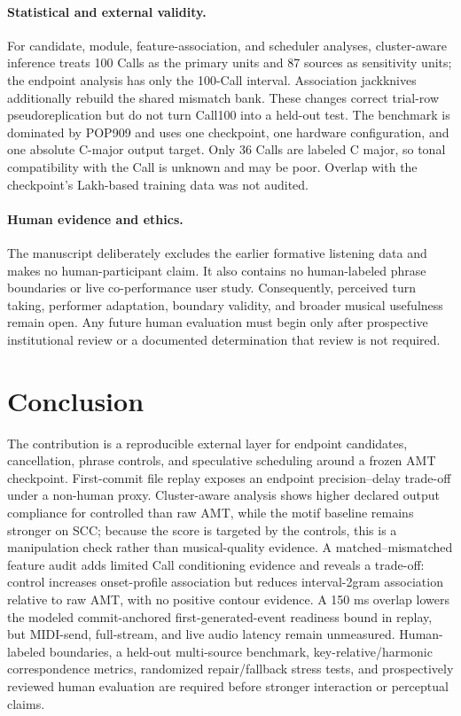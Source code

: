 \documentclass[11pt,a4paper]{article}
\begin{document}
\paragraph{Statistical and external validity.}
For candidate, module, feature-association, and scheduler analyses, cluster-aware inference treats 100 Calls as the primary units and 87 sources as sensitivity units; the endpoint analysis has only the 100-Call interval. Association jackknives additionally rebuild the shared mismatch bank. These changes correct trial-row pseudoreplication but do not turn Call100 into a held-out test. The benchmark is dominated by POP909 and uses one checkpoint, one hardware configuration, and one absolute C-major output target. Only 36 Calls are labeled C major, so tonal compatibility with the Call is unknown and may be poor. Overlap with the checkpoint's Lakh-based training data was not audited.

\paragraph{Human evidence and ethics.}
The manuscript deliberately excludes the earlier formative listening data and makes no human-participant claim. It also contains no human-labeled phrase boundaries or live co-performance user study. Consequently, perceived turn taking, performer adaptation, boundary validity, and broader musical usefulness remain open. Any future human evaluation must begin only after prospective institutional review or a documented determination that review is not required.

\section{Conclusion}
\label{sec:conclusion-future-work}

The contribution is a reproducible external layer for endpoint candidates, cancellation, phrase controls, and speculative scheduling around a frozen AMT checkpoint. First-commit file replay exposes an endpoint precision--delay trade-off under a non-human proxy. Cluster-aware analysis shows higher declared output compliance for controlled than raw AMT, while the motif baseline remains stronger on SCC; because the score is targeted by the controls, this is a manipulation check rather than musical-quality evidence. A matched--mismatched feature audit adds limited Call conditioning evidence and reveals a trade-off: control increases onset-profile association but reduces interval-2gram association relative to raw AMT, with no positive contour evidence. A 150 ms overlap lowers the modeled commit-anchored first-generated-event readiness bound in replay, but MIDI-send, full-stream, and live audio latency remain unmeasured. Human-labeled boundaries, a held-out multi-source benchmark, key-relative/harmonic correspondence metrics, randomized repair/fallback stress tests, and prospectively reviewed human evaluation are required before stronger interaction or perceptual claims.
\end{document}
